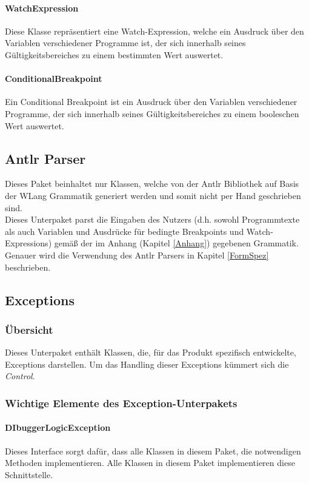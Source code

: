 \documentclass[parskip=full]{scrartcl}
\begin{document}
\paragraph{WatchExpression}
Diese Klasse repräsentiert eine Watch-Expression, welche ein Ausdruck über den Variablen verschiedener Programme ist, der sich innerhalb seines Gültigkeitsbereiches zu einem bestimmten Wert auswertet.
\paragraph{ConditionalBreakpoint}
Ein Conditional Breakpoint ist ein Ausdruck über den Variablen verschiedener Programme, der sich innerhalb seines Gültigkeitsbereiches zu einem booleschen Wert auswertet.

\subsection{Antlr Parser}
Dieses Paket beinhaltet nur Klassen, welche von der Antlr Bibliothek auf Basis der WLang Grammatik generiert werden und somit nicht per Hand geschrieben sind. \\
Dieses Unterpaket parst die Eingaben des Nutzers (d.h. sowohl Programmtexte als auch Variablen und Ausdrücke für bedingte Breakpoints und Watch-Expressions) gemäß der im Anhang (Kapitel \ref{Anhang})  gegebenen Grammatik. Genauer wird die Verwendung des Antlr Parsers in Kapitel \ref{FormSpez} beschrieben.

\subsection{Exceptions}
\subsubsection{Übersicht}
Dieses Unterpaket enthält Klassen, die, für das Produkt spezifisch entwickelte, Exceptions darstellen. Um das Handling dieser Exceptions kümmert sich die \textit{Control}.
\subsubsection{Wichtige Elemente des Exception-Unterpakets}
\paragraph{DIbuggerLogicException}
Dieses Interface sorgt dafür, dass alle Klassen in diesem Paket, die notwendigen Methoden implementieren.
Alle Klassen in diesem Paket implementieren diese Schnittstelle. 
\end{document}
